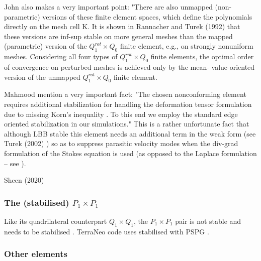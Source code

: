 \begin{remark} 
John also makes a very important point: "There are also unmapped (non-parametric) versions of 
these finite element spaces, which define the polynomials directly on the mesh cell K. It is shown in Rannacher
and Turek (1992) \cite{ratu92} that these versions are inf-sup stable on more general meshes than
the mapped (parametric) version of the $Q_1^{rot}\times Q_0$ finite element, e.g., on strongly
nonuniform meshes. Considering all four types of $Q_1^{rot}\times Q_0$ finite elements, the
optimal order of convergence on perturbed meshes is achieved only by the mean-
value-oriented version of the unmapped $Q_1^{rot}\times Q_0$   finite element.
\end{remark}

Mahmood \etal \cite{maky17} mention a very important fact: "The chosen nonconforming element requires
additional stabilization for handling the deformation tensor formulation due to missing Korn's inequality 
\cite{horg95,knob00}.
To this end we employ the standard edge oriented stabilization \cite{tuos02,tuou07} in our simulations."
This is a rather unfortunate fact that although LBB stable this element needs an additional 
term in the weak form (see Turek \etal (2002) \cite{tuos02}) 
so as to suppress parasitic velocity modes when the div-grad formulation 
of the Stokes equation is used (as opposed to the Laplace formulation -- see \cite[Section 6.5.2]{dohu03}).

\Literature Sheen (2020) \cite{shee20}




\subsubsection{The (stabilised) $P_1\times P_1$} \label{ss:P1P1stab}

Like its quadrilateral counterpart $Q_1\times Q_1$, the 
$P_1\times P_1$ pair is not stable and needs to be stabilised \cite{nosi98,tasu00}.
TerraNeo code uses stabilised with PSPG \cite{babd20}.





\subsubsection{Other elements}

